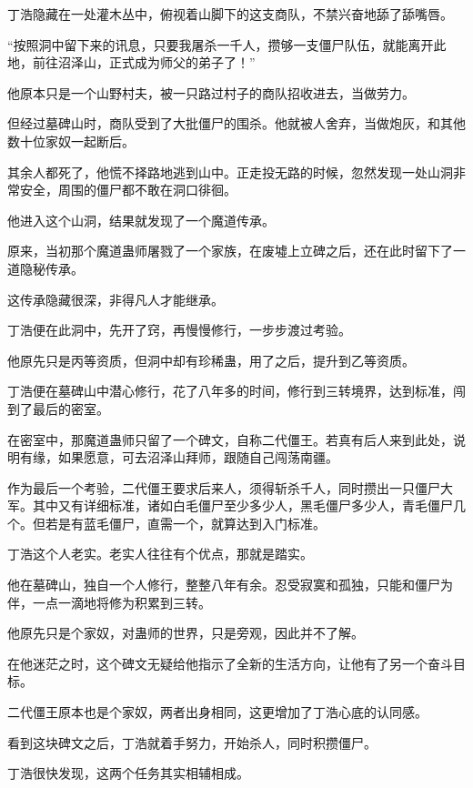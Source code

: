 
\begin{this_body}

丁浩隐藏在一处灌木丛中，俯视着山脚下的这支商队，不禁兴奋地舔了舔嘴唇。

“按照洞中留下来的讯息，只要我屠杀一千人，攒够一支僵尸队伍，就能离开此地，前往沼泽山，正式成为师父的弟子了！”

他原本只是一个山野村夫，被一只路过村子的商队招收进去，当做劳力。

但经过墓碑山时，商队受到了大批僵尸的围杀。他就被人舍弃，当做炮灰，和其他数十位家奴一起断后。

其余人都死了，他慌不择路地逃到山中。正走投无路的时候，忽然发现一处山洞非常安全，周围的僵尸都不敢在洞口徘徊。

他进入这个山洞，结果就发现了一个魔道传承。

原来，当初那个魔道蛊师屠戮了一个家族，在废墟上立碑之后，还在此时留下了一道隐秘传承。

这传承隐藏很深，非得凡人才能继承。

丁浩便在此洞中，先开了窍，再慢慢修行，一步步渡过考验。

他原先只是丙等资质，但洞中却有珍稀蛊，用了之后，提升到乙等资质。

丁浩便在墓碑山中潜心修行，花了八年多的时间，修行到三转境界，达到标准，闯到了最后的密室。

在密室中，那魔道蛊师只留了一个碑文，自称二代僵王。若真有后人来到此处，说明有缘，如果愿意，可去沼泽山拜师，跟随自己闯荡南疆。

作为最后一个考验，二代僵王要求后来人，须得斩杀千人，同时攒出一只僵尸大军。其中又有详细标准，诸如白毛僵尸至少多少人，黑毛僵尸多少人，青毛僵尸几个。但若是有蓝毛僵尸，直需一个，就算达到入门标准。

丁浩这个人老实。老实人往往有个优点，那就是踏实。

他在墓碑山，独自一个人修行，整整八年有余。忍受寂寞和孤独，只能和僵尸为伴，一点一滴地将修为积累到三转。

他原先只是个家奴，对蛊师的世界，只是旁观，因此并不了解。

在他迷茫之时，这个碑文无疑给他指示了全新的生活方向，让他有了另一个奋斗目标。

二代僵王原本也是个家奴，两者出身相同，这更增加了丁浩心底的认同感。

看到这块碑文之后，丁浩就着手努力，开始杀人，同时积攒僵尸。

丁浩很快发现，这两个任务其实相辅相成。


\end{this_body}
